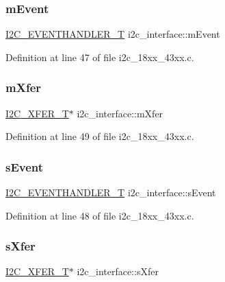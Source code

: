 \subsubsection{\texorpdfstring{m\+Event}{mEvent}}
{\footnotesize\ttfamily \hyperlink{group___i2_c__18_x_x__43_x_x_gaef152f4dc1487d90573810007489082e}{I2\+C\+\_\+\+E\+V\+E\+N\+T\+H\+A\+N\+D\+L\+E\+R\+\_\+T} i2c\+\_\+interface\+::m\+Event}



Definition at line 47 of file i2c\+\_\+18xx\+\_\+43xx.\+c.

\mbox{\label{structi2c__interface_a8894534cc883275b847f183e6fe1e7e6}} 
\subsubsection{\texorpdfstring{m\+Xfer}{mXfer}}
{\footnotesize\ttfamily \hyperlink{struct_i2_c___x_f_e_r___t}{I2\+C\+\_\+\+X\+F\+E\+R\+\_\+T}$\ast$ i2c\+\_\+interface\+::m\+Xfer}



Definition at line 49 of file i2c\+\_\+18xx\+\_\+43xx.\+c.

\mbox{\label{structi2c__interface_aa0820cc1e59b1da898435b4813f5c58d}} 
\subsubsection{\texorpdfstring{s\+Event}{sEvent}}
{\footnotesize\ttfamily \hyperlink{group___i2_c__18_x_x__43_x_x_gaef152f4dc1487d90573810007489082e}{I2\+C\+\_\+\+E\+V\+E\+N\+T\+H\+A\+N\+D\+L\+E\+R\+\_\+T} i2c\+\_\+interface\+::s\+Event}



Definition at line 48 of file i2c\+\_\+18xx\+\_\+43xx.\+c.

\mbox{\label{structi2c__interface_a891a1ea53436714c117aaa2d0917e9f2}} 
\subsubsection{\texorpdfstring{s\+Xfer}{sXfer}}
{\footnotesize\ttfamily \hyperlink{struct_i2_c___x_f_e_r___t}{I2\+C\+\_\+\+X\+F\+E\+R\+\_\+T}$\ast$ i2c\+\_\+interface\+::s\+Xfer}



